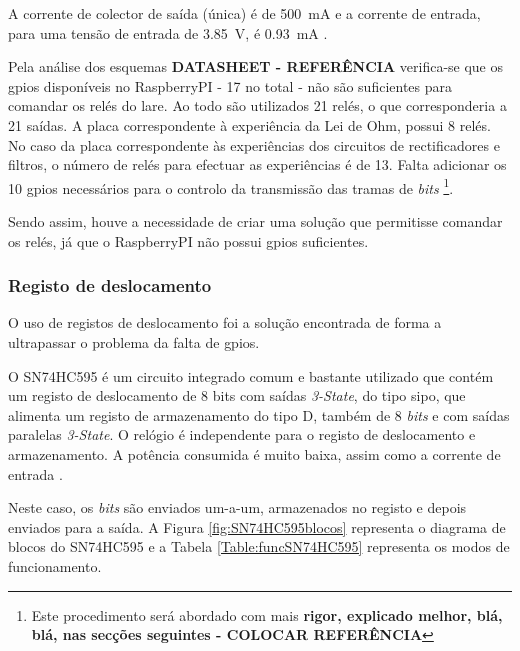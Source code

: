 A corrente de colector de saída (única) é de \SI{500}{\mA} e a corrente de entrada, para uma tensão de entrada de \SI{3.85}{\volt}, é \SI{0.93}{\mA} \cite{ULN2003}.

Pela análise dos esquemas \textbf{DATASHEET - REFERÊNCIA} verifica-se que os \acrshort{gpio}s disponíveis no \gls{RaspberryPI} - 17 no total - não são suficientes para comandar os relés do \acrshort{lare}. Ao todo são utilizados 21 relés, o que corresponderia a 21 saídas. A placa correspondente à experiência da Lei de Ohm, possui 8 relés. No caso da placa correspondente às experiências dos circuitos de rectificadores e filtros, o número de relés para efectuar as experiências é de 13. Falta adicionar os 10 \acrshort{gpio}s necessários para o controlo da transmissão das tramas de \textit{bits} \footnote{Este procedimento será abordado com mais \textbf{rigor, explicado melhor, blá, blá, nas secções seguintes - COLOCAR REFERÊNCIA}}.

Sendo assim, houve a necessidade de criar uma solução que permitisse comandar os relés, já que o \gls{RaspberryPI} não possui \acrshort{gpio}s suficientes.

\subsubsection{Registo de deslocamento}
O uso de registos de deslocamento foi a solução encontrada de forma a ultrapassar o problema da falta de \acrshort{gpio}s.

O SN74HC595 é um circuito integrado comum e bastante utilizado que contém um registo de deslocamento de 8 bits com saídas \textit{3-State}, do tipo \acrfull{sipo}, que alimenta um registo de armazenamento do tipo D, também de 8 \textit{bits} e com saídas paralelas \textit{3-State}. O relógio é independente para o registo de deslocamento e armazenamento. A potência consumida é muito baixa, assim como a corrente de entrada \cite{SN74HC595}.

Neste caso, os \textit{bits} são enviados um-a-um, armazenados no registo e depois enviados para a saída. A Figura \ref{fig:SN74HC595blocos} representa o diagrama de blocos do SN74HC595 e a Tabela \ref{Table:funcSN74HC595} representa os modos de funcionamento.

